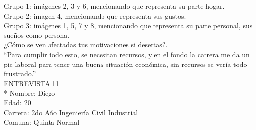 Grupo 1: imágenes 2, 3 y 6, mencionando que representa su parte hogar. \\

Grupo 2: imagen 4, mencionando que representa sus gustos.\\

Grupo 3: imágenes 1, 5, 7 y 8, mencionando que representa su parte personal, sus sueños como persona. \\

¿Cómo se ven afectadas tus motivaciones si desertas?.\\

``Para cumplir todo esto, se necesitan recursos, y en el fondo la carrera me da un pie laboral para tener una buena situación económica, sin recursos se vería todo frustrado.'' \\

\newpage
\underline {ENTREVISTA 11}\\*
Nombre: Diego\\
Edad: 20\\
Carrera: 2do Año Ingeniería Civil Industrial\\
Comuna: Quinta Normal\\

